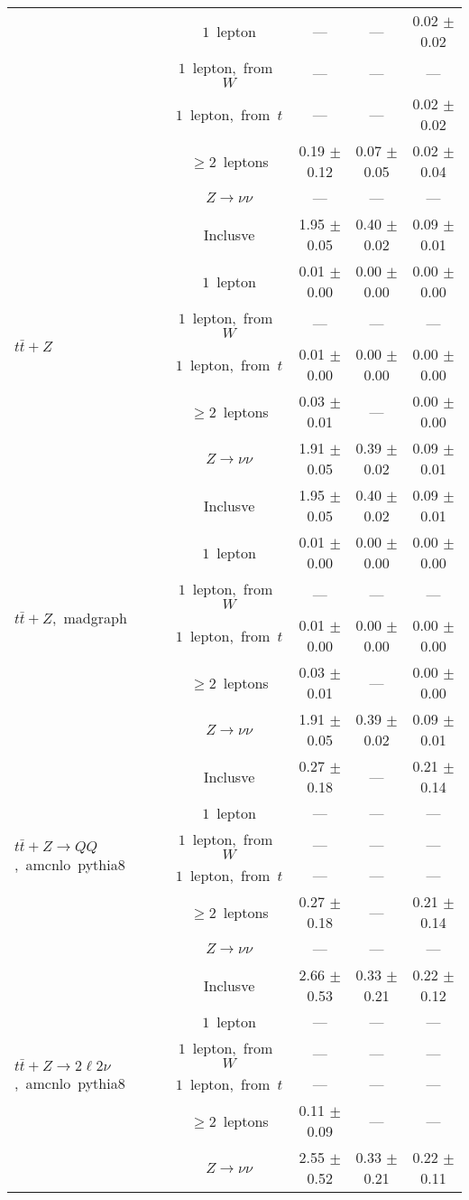 \documentclass{article}
\begin{document}
\begin{longtable}{|l|c|c|c|c|}
 & $1$~lepton  & ---  & ---  & 0.02 $\pm$ 0.02 \\* 
 & $1$~lepton,~from~$W$  & ---  & ---  & --- \\* 
 & $1$~lepton,~from~$t$  & ---  & ---  & 0.02 $\pm$ 0.02 \\* 
 & $\ge2$~leptons  & 0.19 $\pm$ 0.12  & 0.07 $\pm$ 0.05  & 0.02 $\pm$ 0.04 \\* 
 & $Z\rightarrow\nu\nu$  & ---  & ---  & --- \\* 
\hline 
\multirow{6}{*}{$t\bar{t}+Z$} & Inclusve  & 1.95 $\pm$ 0.05  & 0.40 $\pm$ 0.02  & 0.09 $\pm$ 0.01 \\* 
 & $1$~lepton  & 0.01 $\pm$ 0.00  & 0.00 $\pm$ 0.00  & 0.00 $\pm$ 0.00 \\* 
 & $1$~lepton,~from~$W$  & ---  & ---  & --- \\* 
 & $1$~lepton,~from~$t$  & 0.01 $\pm$ 0.00  & 0.00 $\pm$ 0.00  & 0.00 $\pm$ 0.00 \\* 
 & $\ge2$~leptons  & 0.03 $\pm$ 0.01  & ---  & 0.00 $\pm$ 0.00 \\* 
 & $Z\rightarrow\nu\nu$  & 1.91 $\pm$ 0.05  & 0.39 $\pm$ 0.02  & 0.09 $\pm$ 0.01 \\* 
\hline 
\multirow{6}{*}{$t\bar{t}+Z$,~madgraph} & Inclusve  & 1.95 $\pm$ 0.05  & 0.40 $\pm$ 0.02  & 0.09 $\pm$ 0.01 \\* 
 & $1$~lepton  & 0.01 $\pm$ 0.00  & 0.00 $\pm$ 0.00  & 0.00 $\pm$ 0.00 \\* 
 & $1$~lepton,~from~$W$  & ---  & ---  & --- \\* 
 & $1$~lepton,~from~$t$  & 0.01 $\pm$ 0.00  & 0.00 $\pm$ 0.00  & 0.00 $\pm$ 0.00 \\* 
 & $\ge2$~leptons  & 0.03 $\pm$ 0.01  & ---  & 0.00 $\pm$ 0.00 \\* 
 & $Z\rightarrow\nu\nu$  & 1.91 $\pm$ 0.05  & 0.39 $\pm$ 0.02  & 0.09 $\pm$ 0.01 \\* 
\hline 
\multirow{6}{*}{$t\bar{t}+Z{\rightarrow}QQ$,~amcnlo~pythia8} & Inclusve  & 0.27 $\pm$ 0.18  & ---  & 0.21 $\pm$ 0.14 \\* 
 & $1$~lepton  & ---  & ---  & --- \\* 
 & $1$~lepton,~from~$W$  & ---  & ---  & --- \\* 
 & $1$~lepton,~from~$t$  & ---  & ---  & --- \\* 
 & $\ge2$~leptons  & 0.27 $\pm$ 0.18  & ---  & 0.21 $\pm$ 0.14 \\* 
 & $Z\rightarrow\nu\nu$  & ---  & ---  & --- \\* 
\hline 
\multirow{6}{*}{$t\bar{t}+Z{\rightarrow}2{\ell}2{\nu}$,~amcnlo~pythia8} & Inclusve  & 2.66 $\pm$ 0.53  & 0.33 $\pm$ 0.21  & 0.22 $\pm$ 0.12 \\* 
 & $1$~lepton  & ---  & ---  & --- \\* 
 & $1$~lepton,~from~$W$  & ---  & ---  & --- \\* 
 & $1$~lepton,~from~$t$  & ---  & ---  & --- \\* 
 & $\ge2$~leptons  & 0.11 $\pm$ 0.09  & ---  & --- \\* 
 & $Z\rightarrow\nu\nu$  & 2.55 $\pm$ 0.52  & 0.33 $\pm$ 0.21  & 0.22 $\pm$ 0.11 \\* 
\hline 
\end{longtable} 
\end{document}
